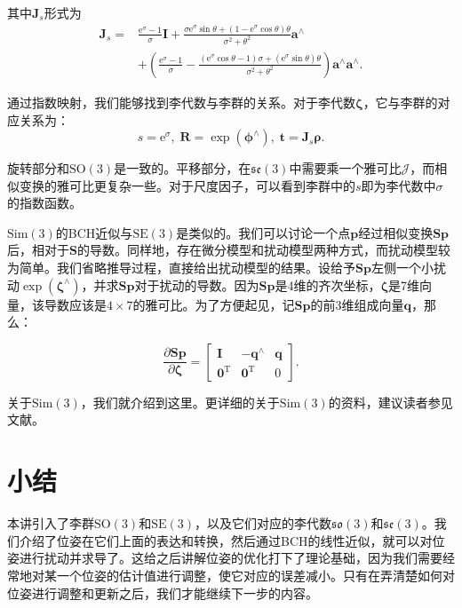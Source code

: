 其中$\bm{J}_s$形式为
\begin{align*}
{ \bm{J}_s} =& \frac{{{\mathrm{e}^\sigma } - 1}}{\sigma } \bm{I} + \frac{ \sigma {{\mathrm{e}^\sigma }\sin \theta  + \left( {1 - {\mathrm{e}^\sigma }\cos \theta } \right)\theta }}{{{\sigma ^2} + {\theta ^2}}}{\bm{a}^ \wedge }\\
 &+ \left( {\frac{{{\mathrm{e}^\sigma } - 1}}{\sigma } - \frac{{\left( {{\mathrm{e}^\sigma }\cos \theta  - 1} \right)\sigma  + ({\mathrm{e}^\sigma }\sin \theta )\theta }}{{{\sigma ^2} + {\theta ^2}}}} \right){\bm{a}^ \wedge }{\bm{a}^ \wedge }.
\end{align*}

通过指数映射，我们能够找到李代数与李群的关系。对于李代数$\bm{\zeta}$，它与李群的对应关系为：
\begin{equation}
s=\mathrm{e}^\sigma, \; \bm{R} = \exp( \bm{\phi} ^\wedge), \; \bm{t} = \bm{J}_s \bm{\rho}.
\end{equation}

旋转部分和$\mathrm{SO}(3)$是一致的。平移部分，在$\mathfrak{se}(3)$中需要乘一个雅可比$\bm{\mathcal{J}}$，而相似变换的雅可比更复杂一些。对于尺度因子，可以看到李群中的$s$即为李代数中$\sigma$的指数函数。

$\mathrm{Sim}(3)$的BCH近似与$\mathrm{SE}(3)$是类似的。我们可以讨论一个点$\bm{p}$经过相似变换$\bm{S} \bm{p}$后，相对于$\bm{S}$的导数。同样地，存在微分模型和扰动模型两种方式，而扰动模型较为简单。我们省略推导过程，直接给出扰动模型的结果。设给予$\bm{S} \bm{p}$左侧一个小扰动$\exp( \bm{\zeta} ^\wedge )$，并求$\bm{S} \bm{p}$对于扰动的导数。因为$\bm{S} \bm{p}$是4维的齐次坐标，$\bm{\zeta}$是7维向量，该导数应该是$4 \times 7$的雅可比。为了方便起见，记$\bm{Sp}$的前3维组成向量$\bm{q}$，那么：

\begin{equation}
\frac{{\partial \bm{Sp}}}{{\partial \bm{\zeta} }} = \left[ {\begin{array}{*{20}{c}}
	\bm{I} &{ - {\bm{q}^ \wedge }}& \bm{q} \\
	{{\bm{0}^\mathrm{T}}} & {{ \bm{0}^\mathrm{T}}}&0
	\end{array}} \right].
\end{equation}

关于$\mathrm{Sim}(3)$，我们就介绍到这里。更详细的关于$\mathrm{Sim}(3)$的资料，建议读者参见文献\cite{Strasdat2012a}。


\section{小结}
本讲引入了李群$\mathrm{SO}(3)$和$\mathrm{SE}(3)$，以及它们对应的李代数$\mathfrak{so}(3)$和$\mathfrak{se}(3)$。我们介绍了位姿在它们上面的表达和转换，然后通过BCH的线性近似，就可以对位姿进行扰动并求导了。这给之后讲解位姿的优化打下了理论基础，因为我们需要经常地对某一个位姿的估计值进行调整，使它对应的误差减小。只有在弄清楚如何对位姿进行调整和更新之后，我们才能继续下一步的内容。


